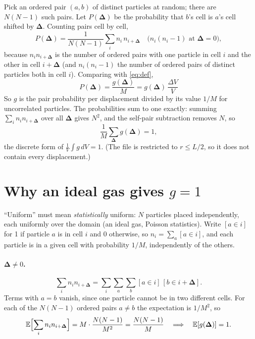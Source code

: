 \documentclass[11pt]{article}
\newcommand{\bD}{\boldsymbol{\Delta}}
\begin{document}
Pick an ordered pair $(a,b)$ of distinct particles at random; there are
$N(N-1)$ such pairs. Let $P(\bD)$ be the probability that $b$'s cell is $a$'s
cell shifted by $\bD$. Counting pairs cell by cell,
\begin{equation}
  P(\bD) = \frac{1}{N(N-1)}\sum_i n_i\,n_{i+\bD}
  \quad\bigl(n_i(n_i-1)\text{ at }\bD=0\bigr),
\end{equation}
because $n_in_{i+\bD}$ is the number of ordered pairs with one particle in cell
$i$ and the other in cell $i+\bD$ (and $n_i(n_i-1)$ the number of ordered pairs
of distinct particles both in cell $i$). Comparing with \eqref{eq:def},
\begin{equation}
  \boxed{\;P(\bD) = \frac{g(\bD)}{M} = g(\bD)\,\frac{\Delta V}{V}\;}
  \label{eq:prob}
\end{equation}
So $g$ is the pair probability per displacement divided by its value $1/M$ for
uncorrelated particles. The probabilities sum to one exactly: summing
$\sum_in_in_{i+\bD}$ over all $\bD$ gives $N^2$, and the self-pair subtraction
removes $N$, so
\begin{equation}
  \frac1M\sum_{\bD} g(\bD) = 1 ,
\end{equation}
the discrete form of $\frac1V\int g\,dV=1$. (The file is restricted to
$r\le L/2$, so it does not contain every displacement.)

\section{\texorpdfstring{Why an ideal gas gives $g=1$}{Why an ideal gas gives g = 1}}

``Uniform'' must mean \emph{statistically} uniform: $N$ particles placed
independently, each uniformly over the domain (an ideal gas, Poisson
statistics). Write $[a\in i]$ for 1 if particle $a$ is in cell $i$ and 0
otherwise, so $n_i=\sum_a[a\in i]$, and each particle is in a given cell with
probability $1/M$, independently of the others.

\paragraph{$\bD\ne0$.}
\begin{equation}
  \sum_i n_in_{i+\bD} = \sum_i\sum_a\sum_b [a\in i]\,[b\in i+\bD] .
\end{equation}
Terms with $a=b$ vanish, since one particle cannot be in two different cells.
For each of the $N(N-1)$ ordered pairs $a\ne b$ the expectation is $1/M^2$, so
\begin{equation}
  \mathbb E\Bigl[\sum_in_in_{i+\bD}\Bigr] = M\cdot\frac{N(N-1)}{M^2}
  = \frac{N(N-1)}{M}
  \quad\Longrightarrow\quad \mathbb E[g(\bD)] = 1 .
\end{equation}
\end{document}
